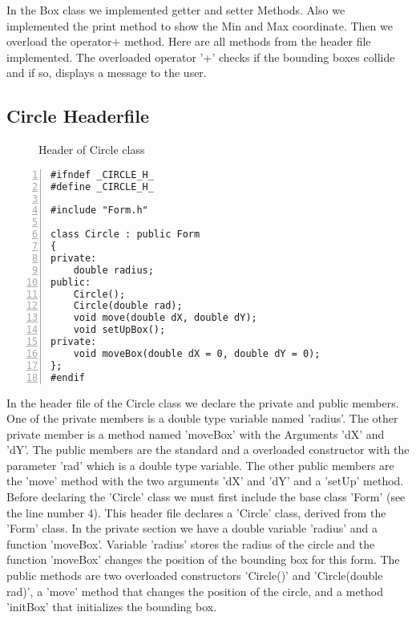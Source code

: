 \documentclass{article}
\begin{document}
\normalsize{In the Box class we implemented getter and setter Methods. Also we implemented the print method to show the Min and Max coordinate. Then we overload the  operator$+$ method.\newline
\newline
Here are all methods from the header file implemented.
The overloaded operator '+' checks if the bounding boxes collide and if so, displays a message to the user. 
}\newpage
\subsection{Circle Headerfile}
\begin{figure}
\scriptsize{\caption{Header of Circle class}}
\end{figure}
\begin{lstlisting}[basicstyle=\footnotesize\ttfamily, numbers=left, stepnumber=1, numberstyle = \normalsize]
#ifndef _CIRCLE_H_
#define _CIRCLE_H_

#include "Form.h"

class Circle : public Form
{
private: 
	double radius; 
public:
	Circle();
	Circle(double rad);
	void move(double dX, double dY);
	void setUpBox();
private:
	void moveBox(double dX = 0, double dY = 0);
};
#endif
\end{lstlisting}
\normalsize{In the header file of the Circle class we declare the private and public members. One of the private members is a double type variable named 'radius'. The other private member is a method named 'moveBox' with the Arguments 'dX' and 'dY'. The public members are the standard and a overloaded constructor with the parameter 'rad' which is a double type variable. The other public members are the 'move' method with the two arguments 'dX' and 'dY' and a 'setUp' method.\newline
\newline
Before declaring the 'Circle' class we must first include the base class 'Form' (see the line number 4).
This header file declares a 'Circle' class, derived from the 'Form' class. 
In the private section we have a double variable 'radius' and a function 'moveBox'. Variable 'radius' stores the radius of the circle and the function 'moveBox' changes the position of the bounding box for this form.	
The public methods are two overloaded constructors 'Circle()' and 'Circle(double rad)', a 'move' method that changes the position of the circle, and a method 'initBox' that initializes the bounding box. 
	
}
\newpage
\end{document}
